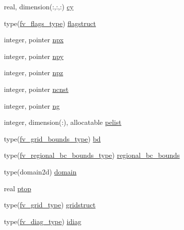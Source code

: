 \begin{DoxyCompactItemize}
\item 
real, dimension(\-:,\-:,\-:) \hyperlink{structfv__arrays__mod_1_1fv__atmos__type_a6051004a5665381f98403598f0d841cb}{cy}
\item 
type(\hyperlink{structfv__arrays__mod_1_1fv__flags__type}{fv\-\_\-flags\-\_\-type}) \hyperlink{structfv__arrays__mod_1_1fv__atmos__type_a690b87301c4d59a583cb3b291c6d2701}{flagstruct}
\item 
integer, pointer \hyperlink{structfv__arrays__mod_1_1fv__atmos__type_a0e54dd727ebba5a1c57fcf0d93c9cf36}{npx}
\item 
integer, pointer \hyperlink{structfv__arrays__mod_1_1fv__atmos__type_ad3e89def6220e74dc7e5bd4d980721f1}{npy}
\item 
integer, pointer \hyperlink{structfv__arrays__mod_1_1fv__atmos__type_a2db29836bd7cb9adb49d819e9c7ae0ce}{npz}
\item 
integer, pointer \hyperlink{structfv__arrays__mod_1_1fv__atmos__type_abb783b1c9289305b504854b91bdd8356}{ncnst}
\item 
integer, pointer \hyperlink{structfv__arrays__mod_1_1fv__atmos__type_ac30aa7aa79c3ce8965781354a6cccfdd}{ng}
\item 
integer, dimension(\-:), allocatable \hyperlink{structfv__arrays__mod_1_1fv__atmos__type_aa3b9aaaf36503aad223be6c46d21a3b5}{pelist}
\item 
type(\hyperlink{structfv__arrays__mod_1_1fv__grid__bounds__type}{fv\-\_\-grid\-\_\-bounds\-\_\-type}) \hyperlink{structfv__arrays__mod_1_1fv__atmos__type_a2a2b12a650ed344e10e00ce708935c78}{bd}
\item 
type(\hyperlink{structfv__arrays__mod_1_1fv__regional__bc__bounds__type}{fv\-\_\-regional\-\_\-bc\-\_\-bounds\-\_\-type}) \hyperlink{structfv__arrays__mod_1_1fv__atmos__type_a685f2987cb3a2f50f28a8ed8b58ce6e6}{regional\-\_\-bc\-\_\-bounds}
\item 
type(domain2d) \hyperlink{structfv__arrays__mod_1_1fv__atmos__type_ade8a5697c963d272c6d9deff35fb15f2}{domain}
\item 
real \hyperlink{structfv__arrays__mod_1_1fv__atmos__type_abaf34c4bb266c7a9964772bfdf12ced3}{ptop}
\item 
type(\hyperlink{structfv__arrays__mod_1_1fv__grid__type}{fv\-\_\-grid\-\_\-type}) \hyperlink{structfv__arrays__mod_1_1fv__atmos__type_a1ee11bc6f17076db85d576290051fcbf}{gridstruct}
\item 
type(\hyperlink{structfv__arrays__mod_1_1fv__diag__type}{fv\-\_\-diag\-\_\-type}) \hyperlink{structfv__arrays__mod_1_1fv__atmos__type_a43f51b4e94d6446147fa220be628bffb}{idiag}

\end{DoxyCompactItemize}
